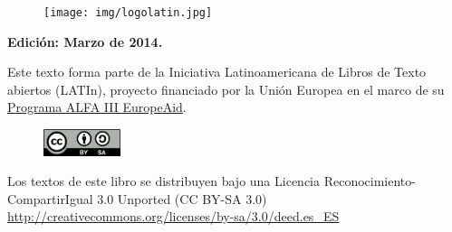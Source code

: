 \null
\vfill

{\parindent0pt

\begin{figure}[h!]
    \texttt{[image: img/logolatin.jpg]}
\end{figure}
\textbf{Edici\'on: Marzo de 2014.}

Este texto forma parte de la Iniciativa Latinoamericana de Libros de Texto abiertos (LATIn), proyecto financiado por la Uni\'on Europea en el marco de su \href{http://www.alfa3programme.eu/es/projects/project/39-LATIN---Iniciativa-latinoamericana-de-libros-de-texto-abiertos}{Programa ALFA III EuropeAid}.

\begin{figure}[h!]
    \includegraphics[width=0.2\textwidth]{Pictures/creativecommons.png}
\end{figure}

Los textos de este libro se distribuyen bajo una Licencia Reconocimiento-CompartirIgual 3.0 Unported (CC BY-SA 3.0) \url{http://creativecommons.org/licenses/by-sa/3.0/deed.es_ES}

}